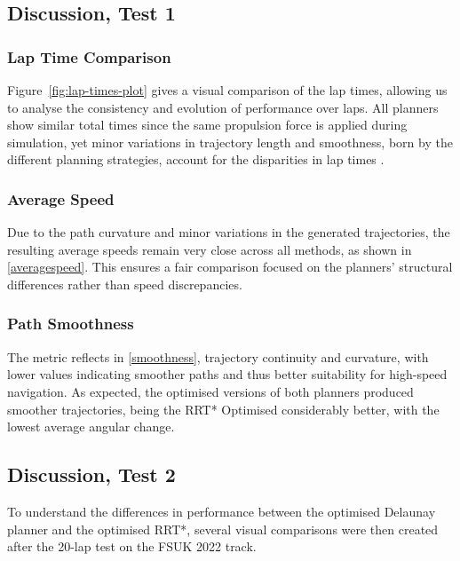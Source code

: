 \documentclass[a4paper,11pt]{report}
\begin{document}
\subsection{Discussion, Test 1}
\subsubsection*{Lap Time Comparison}

Figure~\ref{fig:lap-times-plot} gives a visual comparison of the lap times, allowing us to analyse the
consistency and evolution of performance over laps. All planners show similar total times
since the same propulsion force is applied during simulation, yet minor variations in trajectory
length and smoothness, born by the different planning strategies, account for the disparities in
lap times \cite{reference6}.

\subsubsection*{Average Speed}

Due to the path curvature and minor variations in the generated trajectories, the resulting 
average speeds remain very close across all methods, as shown in \ref{averagespeed}. This ensures a fair comparison focused on the planners' 
structural differences rather than speed discrepancies.

\subsubsection*{Path Smoothness}

The metric reflects in \ref{smoothness}, trajectory continuity and curvature, with lower values indicating smoother paths and thus
better suitability for high-speed navigation. As expected, the optimised versions of both planners produced
smoother trajectories, being the RRT* Optimised considerably better, with the lowest average angular change.


\subsection{Discussion, Test 2}
To understand the differences in performance between the optimised Delaunay planner and the optimised RRT*, 
several visual comparisons were then created after the 20-lap test on the FSUK 2022 track. 
\end{document}
